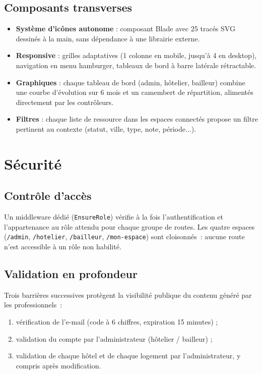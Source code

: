 \documentclass[11pt,a4paper]{report}
\newcommand{\tech}[1]{\texttt{\small #1}}
\begin{document}
\section{Composants transverses}
\begin{itemize}[leftmargin=1.2cm]
    \item \textbf{Système d'icônes autonome} : composant Blade \tech{<x-icon>} avec 25 tracés SVG dessinés à la main, sans dépendance à une librairie externe.
    \item \textbf{Responsive} : grilles adaptatives (1 colonne en mobile, jusqu'à 4 en desktop), navigation en menu hamburger, tableaux de bord à barre latérale rétractable.
    \item \textbf{Graphiques} : chaque tableau de bord (admin, hôtelier, bailleur) combine une courbe d'évolution sur 6 mois et un camembert de répartition, alimentés directement par les contrôleurs.
    \item \textbf{Filtres} : chaque liste de ressource dans les espaces connectés propose un filtre pertinent au contexte (statut, ville, type, note, période...).
\end{itemize}

\chapter{Sécurité}

\section{Contrôle d'accès}
Un middleware dédié (\tech{EnsureRole}) vérifie à la fois l'authentification et l'appartenance au rôle attendu pour chaque groupe de routes. Les quatre espaces (\tech{/admin}, \tech{/hotelier}, \tech{/bailleur}, \tech{/mon-espace}) sont cloisonnés~: aucune route n'est accessible à un rôle non habilité.

\section{Validation en profondeur}
Trois barrières successives protègent la visibilité publique du contenu généré par les professionnels~:
\begin{enumerate}[leftmargin=1.2cm]
    \item vérification de l'e-mail (code à 6 chiffres, expiration 15 minutes) ;
    \item validation du compte par l'administrateur (hôtelier / bailleur) ;
    \item validation de chaque hôtel et de chaque logement par l'administrateur, y compris après modification.
\end{enumerate}
\end{document}
